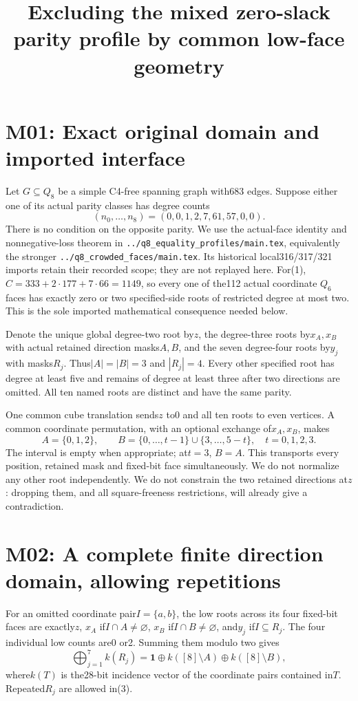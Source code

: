 \documentclass{article}
\begin{document}
\title{Excluding the mixed zero-slack parity profile by common low-face geometry}
\maketitle
\section{M01: Exact original domain and imported interface}
Let $G\subseteq Q_8$ be a simple C4-free spanning graph with683 edges.
Suppose either one of its actual parity classes has degree counts
\[
(n_0,\ldots,n_8)=(0,0,1,2,7,61,57,0,0).                 \tag{1}
\]
There is no condition on the opposite parity. We use the actual-face
identity and nonnegative-loss theorem in
\texttt{../q8\_equality\_profiles/main.tex}, equivalently the stronger
\texttt{../q8\_crowded\_faces/main.tex}. Its historical local316/317/321
imports retain their recorded scope; they are not replayed here.
For(1), $C=333+2\cdot177+7\cdot66=1149$, so every one of the112
actual coordinate $Q_6$ faces has exactly zero or two specified-side
roots of restricted degree at most two. This is the sole imported
mathematical consequence needed below.

Denote the unique global degree-two root by$z$, the degree-three roots
by$x_A,x_B$ with actual retained direction masks$A,B$, and the seven
 degree-four roots by$y_j$ with masks$R_j$. Thus$|A|=|B|=3$ and
$|R_j|=4$. Every other specified root has degree at least five and
remains of degree at least three after two directions are omitted.
All ten named roots are distinct and have the same parity.

One common cube translation sends$z$ to0 and all ten roots to even
vertices. A common coordinate permutation, with an optional exchange
of$x_A,x_B$, makes
\[
 A=\{0,1,2\},\qquad
 B=\{0,\ldots,t-1\}\cup\{3,\ldots,5-t\},\quad t=0,1,2,3. \tag{2}
\]
The interval is empty when appropriate; at$t=3$, $B=A$.
This transports every position, retained mask and fixed-bit face
simultaneously. We do not normalize any other root independently.
We do not constrain the two retained directions at$z$: dropping them,
and all square-freeness restrictions, will already give a contradiction.

\section{M02: A complete finite direction domain, allowing repetitions}
For an omitted coordinate pair$I=\{a,b\}$, the low roots across its
four fixed-bit faces are exactly$z$, $x_A$ if$I\cap A\ne\varnothing$,
$x_B$ if$I\cap B\ne\varnothing$, and$y_j$ if$I\subseteq R_j$.
The four individual low counts are0 or2. Summing them modulo two gives
\[
 \bigoplus_{j=1}^7 k(R_j)
 =\mathbf1\oplus k([8]\setminus A)\oplus k([8]\setminus B),       \tag{3}
\]
where$k(T)$ is the28-bit incidence vector of the coordinate pairs
contained in$T$. Repeated$R_j$ are allowed in(3).
\end{document}
